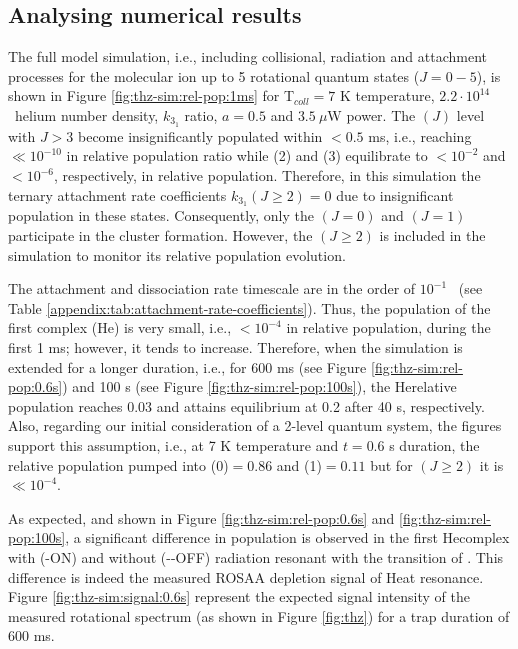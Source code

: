 \subsection{Analysing numerical results}
\label{subsec:CD+-kinetics-simulation-analysis}

The full model simulation, i.e., including collisional, radiation and
attachment processes for the \CD molecular ion up to 5 rotational quantum states
($J=0-5$), is shown in Figure \ref{fig:thz-sim:rel-pop:1ms} for T$_{coll}=7$ K
temperature, $2.2 \cdot 10^{14}$ \percc\ helium number density, $k_{3_1}$
ratio, $a=0.5$ and $3.5\ \mu$W power.
The \CD$(J)$ level with $J>3$ become insignificantly populated within $<0.5$ ms, i.e.,
reaching $\ll 10^{-10}$ in relative population ratio while \CD(2) and \CD(3)
equilibrate to $<10^{-2}$ and $<10^{-6}$, respectively, in relative population. 
Therefore, in this simulation the ternary attachment rate coefficients $k_{3_1}(J\geq 2)=0$
due to insignificant population in these states. Consequently, only the
\CD$(J=0)$ and \CD$(J=1)$ participate in the cluster formation. However, the
\CD$(J \geq 2)$ is included in the simulation to monitor its relative
population evolution.

% 


The attachment and dissociation rate timescale are in the order of $10^{-1}$
\pers\ (see Table \ref{appendix:tab:attachment-rate-coefficients}). Thus, the
population of the first complex (He\CD) is very small, i.e., $<10^{-4}$ in relative
population, during the first 1 ms; however, it tends to increase. Therefore,
when the simulation is extended for a longer duration, i.e., for 600 ms (see
Figure \ref{fig:thz-sim:rel-pop:0.6s}) and 100 s (see Figure
\ref{fig:thz-sim:rel-pop:100s}), the He\CD relative population reaches 0.03 and
attains equilibrium at 0.2 after 40 s, respectively. Also, regarding our initial
consideration of a 2-level quantum system, the figures
support this assumption, i.e., at 7 K temperature and $t=0.6$ s duration, 
the relative population pumped into \CD(0)$=0.86$ and \CD(1)$=0.11$ 
but for \CD$(J\geq 2)$ it is $\ll 10^{-4}$.

As expected, and shown in Figure \ref{fig:thz-sim:rel-pop:0.6s} and
\ref{fig:thz-sim:rel-pop:100s}, a significant difference in population is
observed in the first He\CD complex with (-ON) and without (-\--OFF) radiation resonant 
with the \CDline transition of \CD. This difference is indeed the measured ROSAA 
depletion signal of He\CD at resonance. Figure \ref{fig:thz-sim:signal:0.6s} represent 
the expected signal intensity of the measured rotational spectrum (as shown in Figure \ref{fig:thz}) 
for a trap duration of 600 ms.

